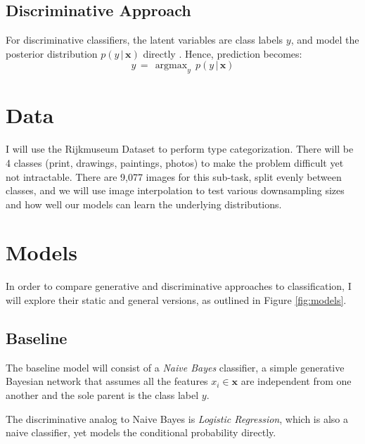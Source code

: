 \documentclass{article}
\DeclareMathOperator*{\argmax}{argmax}
\begin{document}
\subsection{Discriminative Approach}
For discriminative classifiers, the latent variables are class
labels $y$, and model the posterior distribution $p(y\,|\,\mathbf{x})$
directly \cite{NgJordan}. Hence, prediction becomes:
\begin{equation}
  \hat{y} \,=\, \argmax_y \, p(y \,|\, \mathbf{x})
\end{equation}

\section{Data}
I will use the Rijkmuseum Dataset \cite{Rijksmuseum} to perform type categorization.
There will be 4 classes (print, drawings, paintings, photos) to make the problem difficult
yet not intractable. There are 9,077 images for this sub-task, split evenly between classes,
and we will use image interpolation to test various downsampling sizes and how well
our models can learn the underlying distributions.


\section{Models}
In order to compare generative and discriminative
approaches to classification, I will explore their static and general versions,
as outlined in Figure \ref{fig:models}.

\subsection{Baseline}
The baseline model will consist of a \textit{Naive Bayes} classifier, a simple generative
Bayesian network that assumes all the features $x_i \in \mathbf{x}$ are
independent from one another and the sole parent is the class label $y$.

The discriminative analog to Naive Bayes is \textit{Logistic Regression}, which is
also a naive classifier, yet models the conditional probability directly.
\end{document}

